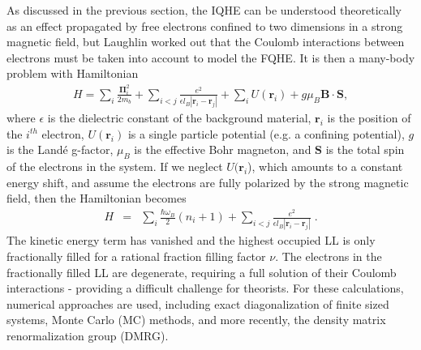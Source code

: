             As discussed in the previous section, the IQHE can be understood theoretically as an effect propagated by free electrons confined to two dimensions in a strong magnetic field, but Laughlin worked out that the Coulomb interactions between electrons must be taken into account to model the FQHE. It is then a many-body problem with Hamiltonian
            \begin{eqnarray}
                H = \sum_i \frac{\mathbf{\Pi}_i^2}{2m_b} + \sum_{i<j} \frac{e^2}{\epsilon l_B |\mathbf{r}_i-\mathbf{r}_j|} + \sum_i U(\mathbf{r}_i) + g\mu_B \mathbf{B}\cdot\mathbf{S},
            \end{eqnarray}
            where $\epsilon$ is the dielectric constant of the background material, $\mathbf{r}_i$ is the position of the $i^{th}$ electron, $U(\mathbf{r}_i)$ is a single particle potential (e.g. a confining potential), $g$ is the Land\'e g-factor, $\mu_B$ is the effective Bohr magneton, and $\mathbf{S}$ is the total spin of the electrons in the system. If we neglect $U(\mathbf{r}_i$), which amounts to a constant energy shift, and assume the electrons are fully polarized by the strong magnetic field, then the Hamiltonian becomes 
            \begin{eqnarray}
                H &=& \sum_i \frac{\hbar\omega_B}{2}(n_i + 1) + \sum_{i<j} \frac{e^2}{\epsilon l_B |\mathbf{r}_i-\mathbf{r}_j|}\;.
            \end{eqnarray}
            The kinetic energy term has vanished and the highest occupied LL is only fractionally filled for a rational fraction filling factor $\nu$. The electrons in the fractionally filled LL are degenerate, requiring a full solution of their Coulomb interactions - providing a difficult challenge for theorists. For these calculations, numerical approaches are used, including exact diagonalization of finite sized systems, Monte Carlo (MC) methods, and more recently, the density matrix renormalization group (DMRG).
            

